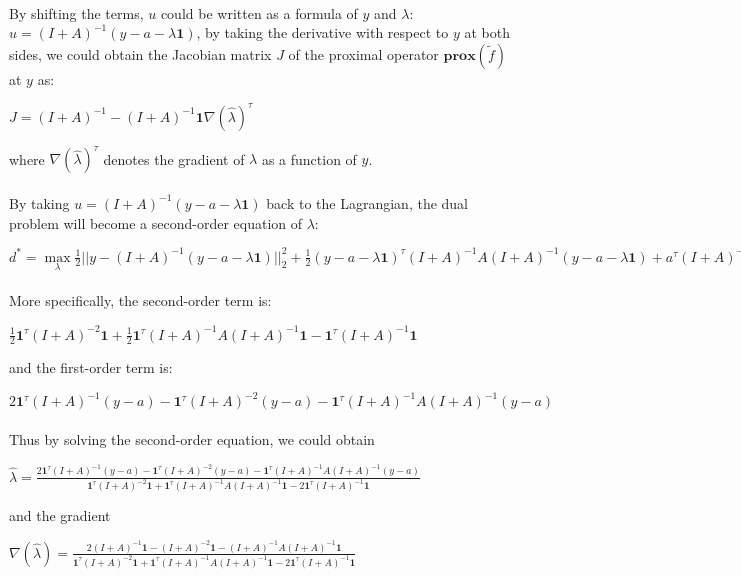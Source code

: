 \documentclass{article}
\begin{document}
\paragraph{}By shifting the terms, $u$ could be written as a formula of $y$ and $\lambda$: $u = (I+A)^{-1}(y-a-\lambda\textbf{1})$, by taking the derivative with respect to $y$ at both sides, we could obtain the Jacobian matrix $J$ of the proximal operator $\textbf{prox}(\tilde{f})$ at $y$ as:
\begin{center}
$J = (I+A)^{-1} -(I+A)^{-1}\textbf{1}\nabla(\hat{\lambda})^{\tau}$
\end{center}
where $\nabla(\hat{\lambda})^{\tau}$ denotes the gradient of $\lambda$ as a function of $y$.
\paragraph{}By taking $u = (I+A)^{-1}(y-a-\lambda\textbf{1})$ back to the Lagrangian, the dual problem will become a second-order equation of $\lambda$:
\begin{center}
$d^{*} = \max\limits_{\lambda} \frac{1}{2}||y-(I+A)^{-1}(y-a-\lambda\textbf{1})||_{2}^{2}+\frac{1}{2}(y-a-\lambda\textbf{1})^{\tau}(I+A)^{-1}A(I+A)^{-1}(y-a-\lambda\textbf{1})+a^{\tau}(I+A)^{-1}(y-a-\lambda\textbf{1})+\lambda\textbf{1}^{\tau}(I+A)^{-1}(y-a-\lambda\textbf{1})$
\end{center}
\paragraph{}More specifically, the second-order term is:
\begin{center}
$\frac{1}{2}\textbf{1}^{\tau}(I+A)^{-2}\textbf{1}+\frac{1}{2}\textbf{1}^{\tau}(I+A)^{-1}A(I+A)^{-1}\textbf{1}-\textbf{1}^{\tau}(I+A)^{-1}\textbf{1}$
\end{center}
and the first-order term is:
\begin{center}
$2\textbf{1}^{\tau}(I+A)^{-1}(y-a)-\textbf{1}^{\tau}(I+A)^{-2}(y-a)-\textbf{1}^{\tau}(I+A)^{-1}A(I+A)^{-1}(y-a)$
\end{center}
\paragraph{}Thus by solving the second-order equation, we could obtain
\begin{center}
$\hat{\lambda} = \frac{2\textbf{1}^{\tau}(I+A)^{-1}(y-a)-\textbf{1}^{\tau}(I+A)^{-2}(y-a)-\textbf{1}^{\tau}(I+A)^{-1}A(I+A)^{-1}(y-a)}{\textbf{1}^{\tau}(I+A)^{-2}\textbf{1}+\textbf{1}^{\tau}(I+A)^{-1}A(I+A)^{-1}\textbf{1}-2\textbf{1}^{\tau}(I+A)^{-1}\textbf{1}}$
\end{center}
and the gradient
\begin{center}
$\nabla(\hat{\lambda}) = \frac{2(I+A)^{-1}\textbf{1}-(I+A)^{-2}\textbf{1}-(I+A)^{-1}A(I+A)^{-1}\textbf{1}}{\textbf{1}^{\tau}(I+A)^{-2}\textbf{1}+\textbf{1}^{\tau}(I+A)^{-1}A(I+A)^{-1}\textbf{1}-2\textbf{1}^{\tau}(I+A)^{-1}\textbf{1}}$\\
\end{center}
\end{document}

